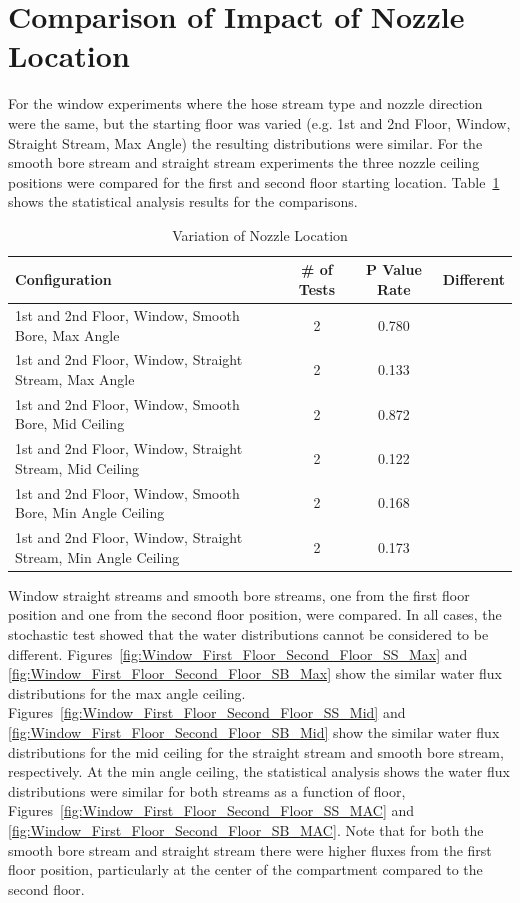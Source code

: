 \documentclass[12pt,oneside]{book}
\begin{document}
\clearpage

\section{Comparison of Impact of Nozzle Location}

For the window experiments where the hose stream type and nozzle direction were the same, but the starting floor was varied (e.g. 1st and 2nd Floor, Window, Straight Stream, Max Angle) the resulting distributions were similar. For the smooth bore stream and straight stream experiments the three nozzle ceiling positions were compared for the first and second floor starting location. Table~\ref{tab:add_nozzlelocation} shows the statistical analysis results for the comparisons.

\begin{table}[!ht]
\centering
\small
\caption{Variation of Nozzle Location}
\label{tab:add_nozzlelocation}
\begin{tabular}{lccc}
\toprule[1.5pt]
Configuration & \# of Tests & P Value Rate & Different \\ 
\midrule
 1st and 2nd Floor, Window, Smooth Bore, Max Angle       & 2          & 0.780   &             \\
 1st and 2nd Floor, Window, Straight Stream, Max Angle   & 2          & 0.133   &             \\
 1st and 2nd Floor, Window, Smooth Bore, Mid Ceiling     & 2          & 0.872   &             \\
 1st and 2nd Floor, Window, Straight Stream, Mid Ceiling & 2          & 0.122   &             \\
 1st and 2nd Floor, Window, Smooth Bore, Min Angle Ceiling     & 2    & 0.168   &             \\
 1st and 2nd Floor, Window, Straight Stream, Min Angle Ceiling & 2    & 0.173   &             \\
\bottomrule[1.25pt]
\end{tabular}
\end{table}

Window straight streams and smooth bore streams, one from the first floor position and one from the second floor position, were compared. In all cases, the stochastic test showed that the water distributions cannot be considered to be different. Figures~\ref{fig:Window_First_Floor_Second_Floor_SS_Max} and \ref{fig:Window_First_Floor_Second_Floor_SB_Max} show the similar water flux distributions for the max angle ceiling. Figures~\ref{fig:Window_First_Floor_Second_Floor_SS_Mid} and \ref{fig:Window_First_Floor_Second_Floor_SB_Mid} show the similar water flux distributions for the mid ceiling for the straight stream and smooth bore stream, respectively. At the min angle ceiling, the statistical analysis shows the water flux distributions were similar for both streams as a function of floor, Figures~\ref{fig:Window_First_Floor_Second_Floor_SS_MAC} and \ref{fig:Window_First_Floor_Second_Floor_SB_MAC}. Note that for both the smooth bore stream and straight stream there were higher fluxes from the first floor position, particularly at the center of the compartment compared to the second floor.
\end{document}
